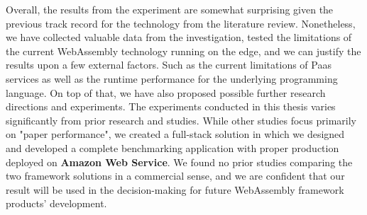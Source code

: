 Overall, the results from the experiment are somewhat surprising given the previous track record for the technology from the literature review. Nonetheless, we have collected valuable data from the investigation, tested the limitations of the current WebAssembly technology running on the edge, and we can justify the results upon a few external factors. Such as the current limitations of Paas services as well as the runtime performance for the underlying programming language. On top of that, we have also proposed possible further research directions and experiments. The experiments conducted in this thesis varies significantly from prior research and studies. While other studies focus primarily on "paper performance", we created a full-stack solution in which we designed and developed a complete benchmarking application with proper production deployed on \textbf{Amazon Web Service}. We found no prior studies comparing the two framework solutions in a commercial sense, and we are confident that our result will be used in the decision-making for future WebAssembly framework products' development.